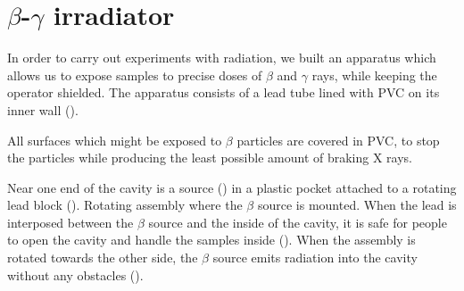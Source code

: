 \section{$\beta$-$\gamma$ irradiator}
\label{sec:irradiador}
In order to carry out experiments with radiation,
we built an apparatus which allows us to expose samples to 
precise doses of $\beta$ and $\gamma$ rays,
while keeping the operator shielded.
The apparatus consists of a lead tube lined with PVC on its inner wall
().

All surfaces which might be exposed to $\beta$ particles are covered in PVC,
to stop the particles while producing the least possible amount of braking
X rays.

Near one end of the cavity is a \Strontium source
()
in a plastic pocket attached to a rotating lead block
().
{Rotating assembly where the $\beta$ source is mounted.}
When the lead is interposed between the $\beta$ source and the inside of the cavity,
it is safe for people to open the cavity and handle the samples inside
().
When the assembly is rotated towards the other side,
the $\beta$ source emits radiation into the cavity without any obstacles
().

